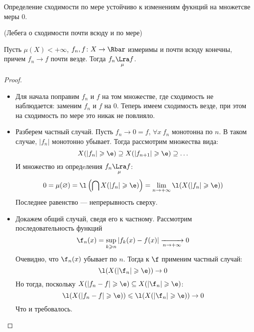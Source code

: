 \begin{remark}
	Определение сходимости по мере устойчиво к изменениям фукнций на множетсве меры 0.
\end{remark}

\begin{theorem}(Лебега о сходимости почти всюду и по мере)

	Пусть $\mu(X) < +\infty$, $f_n, f \colon X \to \Rbar$ измеримы и почти всюду конечны,
	причем  $f_n \to f$ почти везде. Тогда $f_n \underset{\mu}{\Lra} f$.
\end{theorem}
\begin{proof}
	\enewline
	\begin{itemize}
		\item Для начала поправим $f_n$ и $f$ на том множестве, 
			где сходимость не наблюдается: заменим $f_n$ и $f$ на 0.
			Теперь имеем сходимость везде, при этом на сходимость по мере 
			это никак не повлияло.
		\item Разберем частный случай. Пусть $f_n \to 0 = f$, $\forall x~ f_n$
			монотонна по $n$. В таком случае, $|f_n|$ монотонно убывает.
			Тогда рассмотрим множества вида:
\[
	X(|f_n| \geqslant \e) \supseteq X(|f_{n + 1}| \geqslant \e) \supseteq \ldots
\]
			И множество из опредeления $f_n \underset{\mu}{\Lra} f$:
\[
	0 = \mu(\varnothing) = \l\left(\bigcap{X(|f_n| \geqslant \e)}\right) 
	= \lim_{n \to +\infty}{\l(X(|f_n| \geqslant \e))}
\]
			Последнее равенство --- непрерывность сверху.
		\item Докажем общий случай, сведя его к частному. Рассмотрим последовательность
			функций
\[
	\f_n(x) = \sup_{k \geqslant n}{|f_k(x) - f(x)|} \xrightarrow[n \to +\infty]{} 0
\]
			Очевидно, что $\f_n(x)$ убывает по $n$. Тогда к $\f$ применим частный случай:
\[
	\l(X(|\f_n| \geqslant \e)) \to 0
\]
			Но тогда, поскольку $X(|f_n - f| \geqslant \e) 
			\subseteq X(|\f_n| \geqslant \e)$:
\[
	\l(X(|f_n - f| \geqslant \e)) \leqslant \l(X(|\f_n| \geqslant \e)) \to 0
\]
			Что и требовалось.
	\end{itemize}		
\end{proof}


